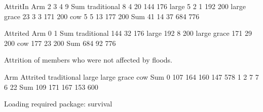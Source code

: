 \begin{Schunk}
\begin{Soutput}
             AttritIn
Arm             2   3   4   9 Sum
  traditional   8   4  20 144 176
  large         5   2   1 192 200
  large grace  23   3   3 171 200
  cow           5   5  13 177 200
  Sum          41  14  37 684 776
\end{Soutput}
\end{Schunk}
\begin{Schunk}
\begin{Soutput}
             Attrited
Arm             0   1 Sum
  traditional 144  32 176
  large       192   8 200
  large grace 171  29 200
  cow         177  23 200
  Sum         684  92 776
\end{Soutput}
\end{Schunk}
Attrition of members who were not affected by floods.
\begin{Schunk}
\begin{Soutput}
        Arm
Attrited traditional large large grace cow Sum
     0           107   164         160 147 578
     1             2     7           7   6  22
     Sum         109   171         167 153 600
\end{Soutput}
\end{Schunk}

\begin{Schunk}
\begin{Soutput}
Loading required package: survival
\end{Soutput}
\end{Schunk}












